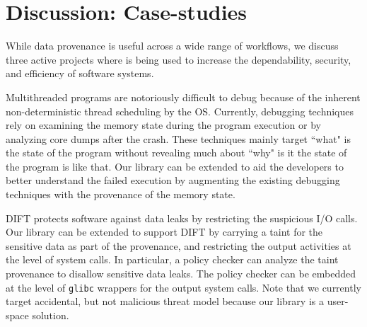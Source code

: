 \section{Discussion: Case-studies}
\label{sec:discussion}
While data provenance is useful across a wide range of workflows, we discuss three active projects where \projecttitle is being used to increase the dependability, security, and efficiency of software systems. 

 Multithreaded programs are notoriously difficult to debug because of the inherent non-deterministic thread scheduling by the OS.  Currently, debugging techniques rely on examining the memory state during the program execution or by analyzing core dumps after the crash. These techniques mainly target ``what" is the state of the program without revealing much about ``why" is it the state of the program is like that. Our library can be extended to aid the developers to better understand the failed execution by augmenting the existing debugging techniques with the provenance of the memory state.


%
%
%


 DIFT protects software against data leaks by restricting the suspicious I/O calls. Our library can be extended to support DIFT by carrying a taint for the sensitive data as part of the provenance, and  restricting the output activities at the level of system calls. In particular, a policy checker can analyze the taint provenance to disallow sensitive data leaks. The policy checker can be embedded at the level of {\tt glibc} wrappers for the output system calls. Note that we currently target accidental, but not malicious threat model because our library is a user-space solution.



